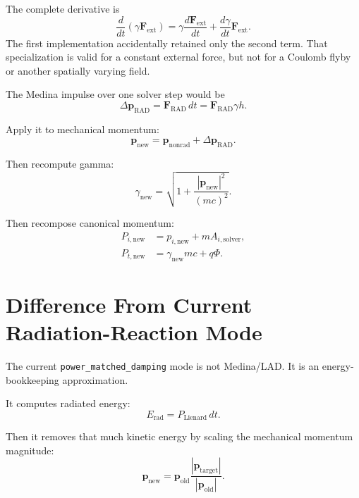 \documentclass[11pt]{article}
\begin{document}
The complete derivative is
\begin{equation}
\frac{d}{dt}\left(\gamma\mathbf{F}_{\mathrm{ext}}\right)
=
\gamma\frac{d\mathbf{F}_{\mathrm{ext}}}{dt}
+
\frac{d\gamma}{dt}\mathbf{F}_{\mathrm{ext}}.
\end{equation}
The first implementation accidentally retained only the second term.  That
specialization is valid for a constant external force, but not for a Coulomb
flyby or another spatially varying field.

The Medina impulse over one solver step would be
\begin{equation}
\Delta \mathbf{p}_{\mathrm{RAD}}
=
\mathbf{F}_{\mathrm{RAD}}\,dt
=
\mathbf{F}_{\mathrm{RAD}}\gamma h.
\end{equation}

Apply it to mechanical momentum:
\begin{equation}
\mathbf{p}_{\mathrm{new}}
=
\mathbf{p}_{\mathrm{nonrad}}
+
\Delta \mathbf{p}_{\mathrm{RAD}}.
\end{equation}

Then recompute gamma:
\begin{equation}
\gamma_{\mathrm{new}}
=
\sqrt{
1 +
\frac{|\mathbf{p}_{\mathrm{new}}|^2}{(mc)^2}
}.
\end{equation}

Then recompose canonical momentum:
\begin{align}
P_{i,\mathrm{new}}
&=
p_{i,\mathrm{new}}
+
m A_{i,\mathrm{solver}},
\\
P_{t,\mathrm{new}}
&=
\gamma_{\mathrm{new}}mc
+
q\Phi.
\end{align}

\section{Difference From Current Radiation-Reaction Mode}

The current \texttt{power\_matched\_damping} mode is not Medina/LAD. It is an
energy-bookkeeping approximation.

It computes radiated energy:
\begin{equation}
E_{\mathrm{rad}}
=
P_{\mathrm{Lienard}}\,dt.
\end{equation}

Then it removes that much kinetic energy by scaling the mechanical momentum
magnitude:
\begin{equation}
\mathbf{p}_{\mathrm{new}}
=
\mathbf{p}_{\mathrm{old}}
\frac{|\mathbf{p}_{\mathrm{target}}|}{|\mathbf{p}_{\mathrm{old}}|}.
\end{equation}
\end{document}
